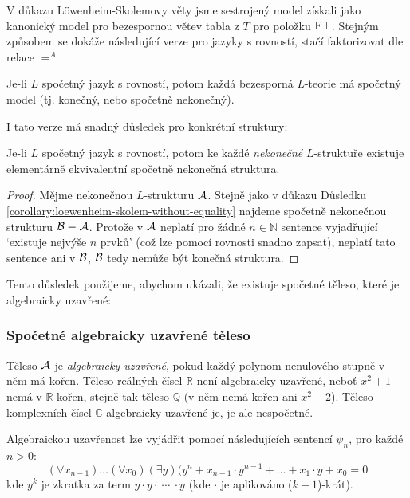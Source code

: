 V důkazu Löwenheim-Skolemovy věty jsme sestrojený model získali jako kanonický model pro bezespornou větev tabla z $T$ pro položku $\mathrm{F}\bot$. Stejným způsobem se dokáže následující verze pro jazyky s rovností, stačí faktorizovat dle relace $=^A$:

\begin{theorem-unnumbered}
    Je-li $L$ spočetný jazyk s rovností, potom každá bezesporná $L$-teorie má spočetný model (tj. konečný, nebo spočetně nekonečný).
\end{theorem-unnumbered}

I tato verze má snadný důsledek pro konkrétní struktury:

\begin{corollary}\label{corollary:loewenheim-skolem-with-equality}
    Je-li $L$ spočetný jazyk s rovností, potom ke každé \emph{nekonečné} $L$-struktuře existuje elementárně ekvivalentní spočetně nekonečná struktura.
\end{corollary}
\begin{proof}
    Mějme nekonečnou $L$-strukturu $\mathcal{A}$. Stejně jako v důkazu Důsledku \ref{corollary:loewenheim-skolem-without-equality} najdeme spočetně nekonečnou strukturu $\mathcal{B}\equiv\mathcal{A}$. Protože v $\mathcal{A}$ neplatí pro žádné $n\in\mathbb N$ sentence vyjadřující `existuje nejvýše $n$ prvků' (což lze pomocí rovnosti snadno zapsat), neplatí tato sentence ani v $\mathcal{B}$, $\mathcal{B}$ tedy nemůže být konečná struktura.
\end{proof}

Tento důsledek použijeme, abychom ukázali, že existuje spočetné těleso, které je algebraicky uzavřené:  

\subsubsection*{Spočetné algebraicky uzavřené těleso}

Těleso $\mathcal{A}$ je \emph{algebraicky uzavřené}, pokud každý polynom nenulového stupně v něm má kořen. Těleso reálných čísel $\mathbb R$ není algebraicky uzavřené, neboť $x^2+1$ nemá v $\mathbb R$ kořen, stejně tak těleso $\mathbb Q$ (v něm nemá kořen ani $x^2-2$). Těleso komplexních čísel $\mathbb C$ algebraicky uzavřené je, je ale nespočetné.

Algebraickou uzavřenost lze vyjádřit pomocí následujících sentencí $\psi_n$, pro každé $n>0$:
$$
(\forall x_{n-1})\dots(\forall x_0)(\exists y)(y^n+x_{n-1}\cdot y^{n-1}+\dots+x_1\cdot y + x_0 = 0
$$
kde $y^k$ je zkratka za term $y\cdot y \cdot\ \cdots\ \cdot y$ (kde  $\cdot$ je aplikováno ($k-1$)-krát).

